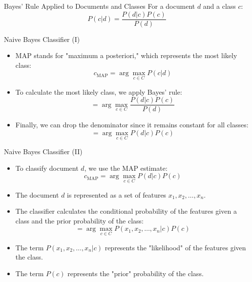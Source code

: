 \documentclass[handout]{beamer}
\begin{document}
\begin{frame}{Bayes' Rule Applied to Documents and Classes}
    For a document $d$ and a class $c$:
    \[
    P(c | d) = \frac{P(d | c)P(c)}{P(d)}
    \]
\end{frame}

\begin{frame}{Naive Bayes Classifier (I)}
\scriptsize
\begin{itemize}
    \item MAP stands for "maximum a posteriori," which represents the most likely class:
    \[
    c_{\text{MAP}} = \arg\max_{c \in C} P(c | d)
    \]
    \item To calculate the most likely class, we apply Bayes' rule:
    \[
    = \arg\max_{c \in C} \frac{P(d | c)P(c)}{P(d)}
    \]
    \item Finally, we can drop the denominator since it remains constant for all classes:
    \[
    = \arg\max_{c \in C} P(d | c)P(c)
    \]
\end{itemize}
\end{frame}

\begin{frame}{Naive Bayes Classifier (II)}
\scriptsize
\begin{itemize}
    \item To classify document $d$, we use the MAP estimate:
    \[
    c_{\text{MAP}} = \arg\max_{c \in C} P(d | c)P(c)
    \]
    \item The document $d$ is represented as a set of features $x_1, x_2, \ldots, x_n$.
    \item The classifier calculates the conditional probability of the features given a class and the prior probability of the class:
    \[
    = \arg\max_{c \in C} P(x_1, x_2, \ldots, x_n | c)P(c)
    \]
    \item The term $P(x_1, x_2, \ldots, x_n | c)$ represents the "likelihood" of the features given the class.
    \item The term $P(c)$ represents the "prior" probability of the class.
\end{itemize}
\end{frame}
\end{document}
